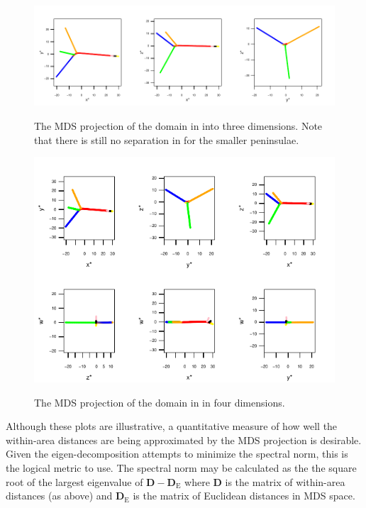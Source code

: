 \begin{figure}
\centering
\includegraphics[width=\textwidth]{mds/figs/comb-3d.pdf} \\
\caption{The MDS projection of the domain in  into three dimensions. Note that there is still no separation in for the smaller peninsulae.}
\label{mds-comb-3d}
\end{figure}

\begin{figure}
\centering
\includegraphics[width=6in]{mds/figs/comb-4d.pdf} \\
\caption{The MDS projection of the domain in  in four dimensions.}
\label{mds-comb-4d}
\end{figure}

Although these plots are illustrative, a quantitative measure of how well the within-area distances are being approximated by the MDS projection is desirable. Given the eigen-decomposition attempts to minimize the spectral norm, this is the logical metric to use. The spectral norm may be calculated as the the square root of the largest eigenvalue of $\mathbf{D}-\mathbf{D}_\text{E}$ where $\mathbf{D}$ is the matrix of within-area distances (as above) and $\mathbf{D}_\text{E}$ is the matrix of Euclidean distances in MDS space.

